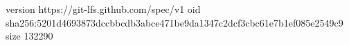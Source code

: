 version https://git-lfs.github.com/spec/v1
oid sha256:5201d4693873dccbbcdb3abce471be9da1347c2dcf3cbc61e7b1ef085e2549c9
size 132290
